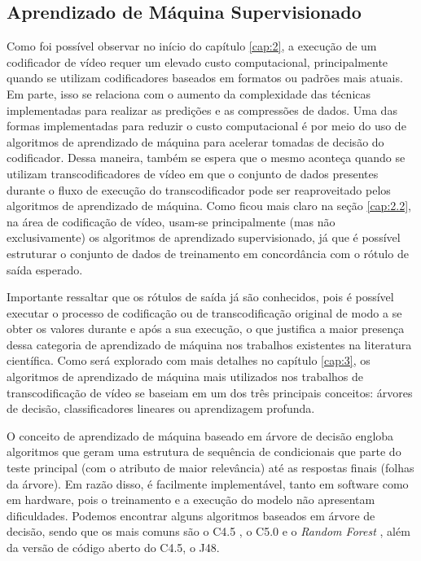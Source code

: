 \subsection{Aprendizado de Máquina Supervisionado}
\label{cap:2.3}

Como foi possível observar no início do capítulo \ref{cap:2}, a execução de um codificador de vídeo requer um elevado custo computacional, principalmente quando se utilizam codificadores baseados em formatos ou padrões mais atuais. Em parte, isso se relaciona com o aumento da complexidade das técnicas implementadas para realizar as predições e as compressões de dados. Uma das formas implementadas para reduzir o custo computacional é por meio do uso de algoritmos de aprendizado de máquina para acelerar tomadas de decisão do codificador. Dessa maneira, também se espera que o mesmo aconteça quando se utilizam transcodificadores de vídeo em que o conjunto de dados presentes durante o fluxo de execução do transcodificador pode ser reaproveitado pelos algoritmos de aprendizado de máquina. Como ficou mais claro na seção \ref{cap:2.2}, na área de codificação de vídeo, usam-se principalmente (mas não exclusivamente) os algoritmos de aprendizado supervisionado, já que é possível estruturar o conjunto de dados de treinamento em concordância com o rótulo de saída esperado.

Importante ressaltar que os rótulos de saída já são conhecidos, pois é possível executar o processo de codificação ou de transcodificação original de modo a se obter os valores durante e após a sua execução, o que justifica a maior presença dessa categoria de aprendizado de máquina nos trabalhos existentes na literatura científica. Como será explorado com mais detalhes no capítulo \ref{cap:3}, os algoritmos de aprendizado de máquina mais utilizados nos trabalhos de transcodificação de vídeo se baseiam em um dos três principais conceitos: árvores de decisão, classificadores lineares ou aprendizagem profunda.

O conceito de aprendizado de máquina baseado em árvore de decisão engloba algoritmos que geram uma estrutura de sequência de condicionais que parte do teste principal (com o atributo de maior relevância) até as respostas finais (folhas da árvore). Em razão disso, é facilmente implementável, tanto em software como em hardware, pois o treinamento e a execução do modelo não apresentam dificuldades. Podemos encontrar alguns algoritmos baseados em árvore de decisão, sendo que os mais comuns são o C4.5 \cite{bib:quinlan_2014}, o C5.0 \cite{bib:quinlan_2020} e o \textit{Random Forest} \cite{bib:breiman_2001}, além da versão de código aberto do C4.5, o J48.

